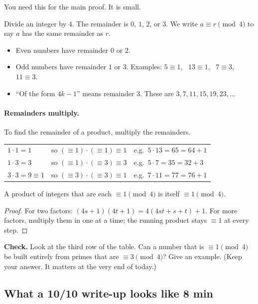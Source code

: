 \documentclass[11pt]{article}
\theoremstyle{plain}
\theoremstyle{definition}
\begin{document}
You need this for the main proof. It is small.

Divide an integer by $4$. The remainder is $0$, $1$, $2$, or $3$. We write $a \equiv r \pmod 4$ to say $a$ has the same remainder as $r$.
\begin{itemize}
  \item Even numbers have remainder $0$ or $2$.
  \item Odd numbers have remainder $1$ or $3$. Examples: $5 \equiv 1$, \ $13 \equiv 1$, \ $7 \equiv 3$, \ $11 \equiv 3$.
  \item ``Of the form $4k - 1$'' means remainder $3$. These are $3, 7, 11, 15, 19, 23, \dots$
\end{itemize}

\paragraph{Remainders multiply.} To find the remainder of a product, multiply the remainders.
\begin{center}
\begin{tabular}{lll}
$1 \cdot 1 = 1$ & so $(\equiv 1)\cdot(\equiv 1) \equiv 1$ & e.g.\ $5 \cdot 13 = 65 = 64 + 1$ \\
$1 \cdot 3 = 3$ & so $(\equiv 1)\cdot(\equiv 3) \equiv 3$ & e.g.\ $5 \cdot 7 = 35 = 32 + 3$ \\
$3 \cdot 3 = 9 \equiv 1$ & so $(\equiv 3)\cdot(\equiv 3) \equiv 1$ & e.g.\ $7 \cdot 11 = 77 = 76 + 1$ \\
\end{tabular}
\end{center}

\begin{lemma}
A product of integers that are each $\equiv 1 \pmod 4$ is itself $\equiv 1 \pmod 4$.
\end{lemma}
\begin{proof}
For two factors: $(4s+1)(4t+1) = 4(4st + s + t) + 1$. For more factors, multiply them in one at a time; the running product stays $\equiv 1$ at every step.
\end{proof}

\noindent\textbf{Check.} Look at the third row of the table. Can a number that is $\equiv 1 \pmod 4$ be built entirely from primes that are $\equiv 3 \pmod 4$? Give an example. (Keep your answer. It matters at the very end of today.)

\subsection{What a 10/10 write-up looks like \hfill 8 min}
\end{document}
